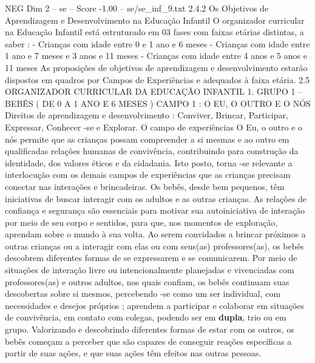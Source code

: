 \begin{textsample}{NEG Dim 2 – se – Score -1.00 – se/se\_inf\_9.txt}  \label{ex:f2_neg_262}
2.4.2 Os Objetivos de Aprendizagem e Desenvolvimento na Educação Infantil O organizador curricular na Educação Infantil está estruturado em 03 fases com faixas etárias distintas, a saber : - Crianças com idade entre 0 e 1 ano e 6 meses - Crianças com idade entre 1 ano e 7 meses e 3 anos e 11 meses - Crianças com idade entre 4 anos e 5 anos e 11 meses As proposições de objetivos de aprendizagem e desenvolvimento estarão dispostos em quadros por Campos de Experiências e adequados à faixa etária. 2.5 ORGANIZADOR CURRICULAR DA EDUCAÇÃO INFANTIL 1.
GRUPO 1 – BEBÊS ( DE 0 A 1 ANO E 6 MESES ) CAMPO 1 : O EU, O OUTRO E O NÓS Direitos de aprendizagem e desenvolvimento : Conviver, Brincar, Participar, Expressar, Conhecer -se e Explorar.
O campo de experiências O Eu, o outro e o nós permite que as crianças possam compreender a si mesmas e ao outro em qualificadas relações humanas de convivência, contribuindo para construção da identidade, dos valores éticos e da cidadania.
Isto posto, torna -se relevante a interlocução com os demais campos de experiências que as crianças precisam conectar nas interações e brincadeiras.
Os bebês, desde bem pequenos, têm iniciativas de buscar interagir com os adultos e as outras crianças.
As relações de confiança e segurança são essenciais para motivar sua autoiniciativa de interação por meio de seu corpo e sentidos, para que, nos momentos de exploração, aprendam sobre o mundo à sua volta.
Ao serem convidados a brincar próximos a outras crianças ou a interagir com elas ou com seus(as) professores(as), os bebês descobrem diferentes formas de se expressarem e se comunicarem.
Por meio de situações de interação livre ou intencionalmente planejadas e vivenciadas com professores(as) e outros adultos, nos quais confiam, os bebês continuam suas descobertas sobre si mesmos, percebendo -se como um ser individual, com necessidades e desejos próprios ; aprendem a participar e colaborar em situações de convivência, em contato com colegas, podendo ser em \textbf{dupla}, trio ou em grupo.
Valorizando e descobrindo diferentes formas de estar com os outros, os bebês começam a perceber que são capazes de conseguir reações específicas a partir de suas ações, e que suas ações têm efeitos nas outras pessoas.

\end{textsample}
